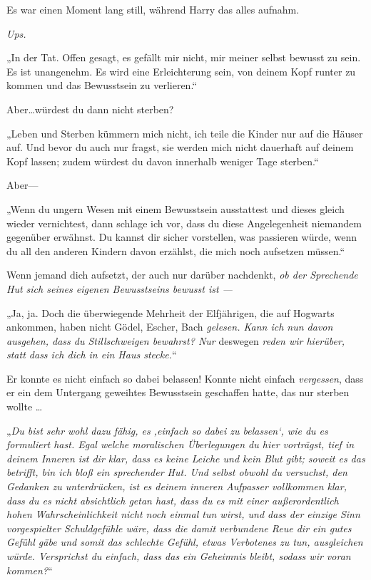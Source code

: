 {Es war einen Moment lang still, während Harry das alles aufnahm.

\emph{Ups.}

„In der Tat. Offen gesagt, es gefällt mir nicht, mir meiner selbst bewusst zu sein. Es ist unangenehm. Es wird eine Erleichterung sein, von deinem Kopf runter zu kommen und das Bewusstsein zu verlieren.“

Aber…würdest du dann nicht sterben?

„Leben und Sterben kümmern mich nicht, ich teile die Kinder nur auf die Häuser auf. Und bevor du auch nur fragst, sie werden mich nicht dauerhaft auf deinem Kopf lassen; zudem würdest du davon innerhalb weniger Tage sterben.“

Aber—

„Wenn du ungern Wesen mit einem Bewusstsein ausstattest und dieses gleich wieder vernichtest, dann schlage ich vor, dass du diese Angelegenheit niemandem gegenüber erwähnst. Du kannst dir sicher vorstellen, was passieren würde, wenn du all den anderen Kindern davon erzählst, die mich noch aufsetzen müssen.“

Wenn jemand dich aufsetzt, der auch nur darüber nachdenkt, \emph{ob der Sprechende Hut sich seines eigenen Bewusstseins bewusst ist —}

„Ja, ja. Doch die überwiegende Mehrheit der Elfjährigen, die auf Hogwarts ankommen, haben nicht Gödel, Escher, Bach \emph{gelesen. Kann ich nun davon ausgehen, dass du Stillschweigen bewahrst? Nur} deswegen \emph{reden wir hierüber, statt dass ich dich in ein Haus stecke.}“

Er konnte es nicht einfach so dabei belassen! Konnte nicht einfach \emph{vergessen}, dass er ein dem Untergang geweihtes Bewusstsein geschaffen hatte, das nur sterben wollte …

„\emph{Du bist sehr wohl dazu fähig, es ‚einfach so dabei zu belassen`, wie du es formuliert hast. Egal welche moralischen Überlegungen du hier vorträgst, tief in deinem Inneren ist dir klar, dass es keine Leiche und kein Blut gibt; soweit es das betrifft, bin ich bloß ein sprechender Hut. Und selbst obwohl du versuchst, den Gedanken zu unterdrücken, ist es deinem inneren Aufpasser vollkommen klar, dass du es nicht absichtlich getan hast, dass du es mit einer außerordentlich hohen Wahrscheinlichkeit nicht noch einmal tun wirst, und dass der einzige Sinn vorgespielter Schuldgefühle wäre, dass die damit verbundene Reue dir ein gutes Gefühl gäbe und somit das schlechte Gefühl, etwas Verbotenes zu tun, ausgleichen würde. Versprichst du einfach, dass das ein Geheimnis bleibt, sodass wir voran kommen?}“

}
